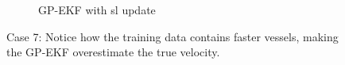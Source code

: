 \begin{figure}
    \begin{subfigure}{\textwidth}
        \caption{GP-EKF with \acrshort{sl} update}
    \end{subfigure}
    \caption{Case 7: Notice how the training data contains faster vessels, making the GP-EKF overestimate the true velocity.}
\end{figure}

